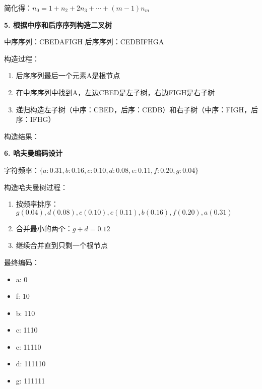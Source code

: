 \documentclass[12pt,a4paper]{amsart}
\begin{document}
简化得：$n_0 = 1 + n_2 + 2n_3 + \cdots + (m-1)n_m$

\textbf{5. 根据中序和后序序列构造二叉树}

中序序列：CBEDAFIGH
后序序列：CEDBIFHGA

构造过程：
\begin{enumerate}
\item 后序序列最后一个元素A是根节点
\item 在中序序列中找到A，左边CBED是左子树，右边FIGH是右子树
\item 递归构造左子树（中序：CBED，后序：CEDB）和右子树（中序：FIGH，后序：IFHG）
\end{enumerate}

构造结果：
\begin{center}
\end{center}

\textbf{6. 哈夫曼编码设计}

字符频率：$\{a:0.31, b:0.16, c:0.10, d:0.08, e:0.11, f:0.20, g:0.04\}$

构造哈夫曼树过程：
\begin{enumerate}
\item 按频率排序：$g(0.04), d(0.08), c(0.10), e(0.11), b(0.16), f(0.20), a(0.31)$
\item 合并最小的两个：$g+d=0.12$
\item 继续合并直到只剩一个根节点
\end{enumerate}

最终编码：
\begin{itemize}
\item a: 0
\item f: 10
\item b: 110
\item c: 1110
\item e: 11110
\item d: 111110
\item g: 111111
\end{itemize}
\end{document}

